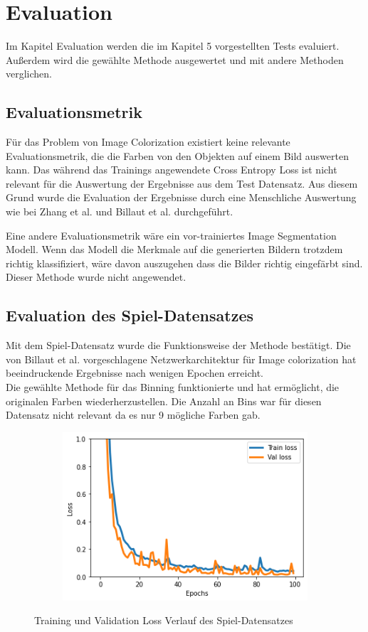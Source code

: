 \chapter{Evaluation}
\label{sec:evaluation}
Im Kapitel Evaluation werden die im Kapitel 5 vorgestellten Tests evaluiert. Außerdem wird die gewählte Methode ausgewertet und
mit andere Methoden verglichen.

\section{Evaluationsmetrik}
Für das Problem von Image Colorization existiert keine relevante Evaluationsmetrik, die die Farben von den Objekten auf einem Bild auswerten kann.
Das während das Trainings angewendete Cross Entropy Loss ist nicht relevant für die Auswertung der Ergebnisse aus dem Test Datensatz. Aus diesem
Grund wurde die Evaluation der Ergebnisse durch eine Menschliche Auswertung wie bei Zhang et al. und Billaut et al.
durchgeführt.

Eine andere Evaluationsmetrik wäre ein vor-trainiertes Image Segmentation Modell. Wenn das Modell die Merkmale auf die generierten Bildern
trotzdem richtig klassifiziert, wäre davon auszugehen dass die Bilder richtig eingefärbt sind. Dieser Methode wurde nicht angewendet.

\section{Evaluation des Spiel-Datensatzes}
Mit dem Spiel-Datensatz wurde die Funktionsweise der Methode bestätigt. Die von Billaut et al. vorgeschlagene Netzwerkarchitektur für Image
colorization hat beeindruckende Ergebnisse nach wenigen Epochen erreicht. 
\\
Die gewählte Methode für das Binning funktionierte und hat ermöglicht, die originalen Farben wiederherzustellen. Die Anzahl an 
Bins war für diesen Datensatz nicht relevant da es nur 9 mögliche Farben gab.

\begin{figure}[H]
  \vspace{1cm}
  \centering
  \begin{subfigure}
    \centering
    \includegraphics[width=.5\textwidth]{resources/experiments/toy_100_324_0001.png}
  \end{subfigure}
  \caption{Training und Validation Loss Verlauf des Spiel-Datensatzes}
  \label{image:toy-dataset-loss}
\end{figure}

